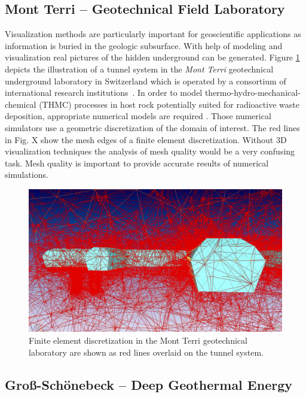 \documentclass[twocolumn]{svjour3}          %
\begin{document}
\subsection{Mont Terri -- Geotechnical Field Laboratory}
\label{Mont Terri -- Geotechnical Field Laboratory}

Visualization methods are particularly important for geoscientific applications as information is buried in the geologic subsurface. With help of modeling and visualization real pictures of the hidden underground can be generated. Figure \ref{fig:mont-terri} depicts the illustration of a tunnel system in the \emph{Mont Terri} geotechnical underground laboratory in Switzerland which is operated by a consortium of international research institutions~\cite{web:mont-terri}. In order to model thermo-hydro-mechanical-chemical (THMC) processes in host rock potentially suited for radioactive waste deposition, appropriate numerical models are required \cite{ Kolditz2004345, Shao20091287, Xie2006122}. Those numerical simulators use a geometric discretization of the domain of interest. The red lines in Fig. X show the mesh edges of a finite element discretization. Without 3D visualization techniques the analysis of mesh quality would be a very confusing task. Mesh quality is important to provide accurate results of numerical simulations.

\begin{figure}[htb]
  \includegraphics[width=\linewidth]{images/mont-terri.jpg}
\caption{Finite element discretization in the Mont Terri geotechnical laboratory are shown as red lines overlaid on the tunnel system.}
\label{fig:mont-terri}
\end{figure}

\subsection{Gro{\ss}-Sch\"onebeck -- Deep Geothermal Energy}
\label{grouss-schoenebeck---geothermal-energy}
\end{document}
